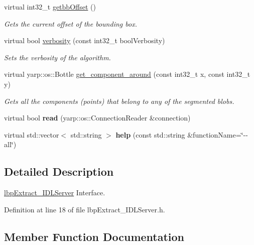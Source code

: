 \begin{DoxyCompactItemize}
virtual int32\+\_\+t \hyperlink{classlbpExtract__IDLServer_a2260626a2137fc9ffe9364fad3444024}{getbb\+Offset} ()
\begin{DoxyCompactList}\small\item\em Gets the current offset of the bounding box. \end{DoxyCompactList}\item 
virtual bool \hyperlink{classlbpExtract__IDLServer_a1b9021d363199f1a334c7ec2c23801b1}{verbosity} (const int32\+\_\+t bool\+Verbosity)
\begin{DoxyCompactList}\small\item\em Sets the verbosity of the algorithm. \end{DoxyCompactList}\item 
virtual yarp\+::os\+::\+Bottle \hyperlink{classlbpExtract__IDLServer_a9d92e9eba6c2ea72a43b1c8077bc6d0a}{get\+\_\+component\+\_\+around} (const int32\+\_\+t x, const int32\+\_\+t y)
\begin{DoxyCompactList}\small\item\em Gets all the components (points) that belong to any of the segmented blobs. \end{DoxyCompactList}\item 
\mbox{\label{classlbpExtract__IDLServer_a677697653e78ed82aaa6543eb875bd41}} 
virtual bool {\bfseries read} (yarp\+::os\+::\+Connection\+Reader \&connection)
\item 
\mbox{\label{classlbpExtract__IDLServer_a13b6fbd034b38f4b5879381dabad05ed}} 
virtual std\+::vector$<$ std\+::string $>$ {\bfseries help} (const std\+::string \&function\+Name=\char`\"{}-\/-\/all\char`\"{})
\end{DoxyCompactItemize}


\subsection{Detailed Description}
\hyperlink{classlbpExtract__IDLServer}{lbp\+Extract\+\_\+\+I\+D\+L\+Server} Interface. 

Definition at line 18 of file lbp\+Extract\+\_\+\+I\+D\+L\+Server.\+h.



\subsection{Member Function Documentation}
\mbox{\label{classlbpExtract__IDLServer_a9d92e9eba6c2ea72a43b1c8077bc6d0a}} 
